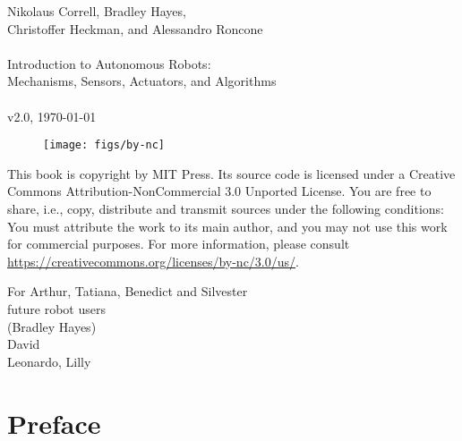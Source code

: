 \documentclass[paper=7in:9in,pagesize=pdftex,11pt,twoside,openright]{scrbook}
\begin{document}


\thispagestyle{empty}
\begin{flushleft}
Nikolaus Correll, Bradley Hayes,\\ Christoffer Heckman, and Alessandro Roncone \\~\\
Introduction to Autonomous Robots:\\ Mechanisms, Sensors, Actuators, and Algorithms\\~\\
v2.0, \today\\
\end{flushleft}

\vfill

\begin{figure}[!h]
\texttt{[image: figs/by-nc]}
\end{figure}

This book is copyright by MIT Press. Its source code is licensed under a Creative Commons Attribution-NonCommercial 3.0 Unported License. You are free to share, i.e., copy, distribute and transmit sources under the following conditions: You must attribute the work to its main author, and you may not use this work for commercial purposes. For more information, please consult \url{https://creativecommons.org/licenses/by-nc/3.0/us/}.

\cleardoublepage
\thispagestyle{empty}
\vspace*{\fill}
\begin{center}
For Arthur, Tatiana, Benedict and Silvester\\
future robot users\\
(Bradley Hayes)
\\
David
\\
Leonardo, Lilly
\end{center}
\vspace*{\fill}

\tableofcontents

\chapter*{Preface}
\end{document}
